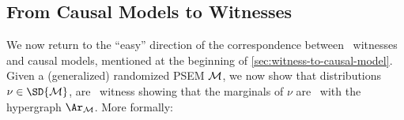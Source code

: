 \begin{subappendices}
\section{From Causal Models to Witnesses}
    \label{appendix:sem2witness}
    
We now return to the ``easy'' direction of the correspondence between \scibility\ witnesses and causal models, mentioned at the beginning of \cref{sec:witness-to-causal-model}.
Given a (generalized) randomized PSEM $\cal M$, we now show that distributions $\nu \in \SD{\cal M}$, are \scibility\ witness showing that the marginals of $\nu$ are \scible\ with the hypergraph $\Ar_{\cal M}$. 
More formally:


\end{subappendices}
